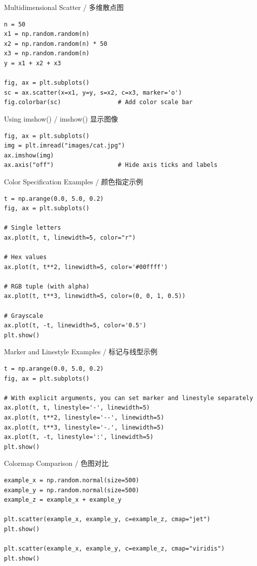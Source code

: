 \documentclass[11pt,a4paper]{report}
\begin{document}
\begin{examplebox}{Multidimensional Scatter / 多维散点图}
\begin{lstlisting}
n = 50
x1 = np.random.random(n)
x2 = np.random.random(n) * 50
x3 = np.random.random(n)
y = x1 + x2 + x3

fig, ax = plt.subplots()
sc = ax.scatter(x=x1, y=y, s=x2, c=x3, marker='o')
fig.colorbar(sc)                # Add color scale bar
\end{lstlisting}
\end{examplebox}

\begin{examplebox}{Using imshow() / imshow() 显示图像}
\begin{lstlisting}
fig, ax = plt.subplots()
img = plt.imread("images/cat.jpg")
ax.imshow(img)
ax.axis("off")                  # Hide axis ticks and labels
\end{lstlisting}
\end{examplebox}

\begin{examplebox}{Color Specification Examples / 颜色指定示例}
\begin{lstlisting}
t = np.arange(0.0, 5.0, 0.2)
fig, ax = plt.subplots()

# Single letters
ax.plot(t, t, linewidth=5, color="r")

# Hex values
ax.plot(t, t**2, linewidth=5, color='#00ffff')

# RGB tuple (with alpha)
ax.plot(t, t**3, linewidth=5, color=(0, 0, 1, 0.5))

# Grayscale
ax.plot(t, -t, linewidth=5, color='0.5')
plt.show()
\end{lstlisting}
\end{examplebox}

\begin{examplebox}{Marker and Linestyle Examples / 标记与线型示例}
\begin{lstlisting}
t = np.arange(0.0, 5.0, 0.2)
fig, ax = plt.subplots()

# With explicit arguments, you can set marker and linestyle separately
ax.plot(t, t, linestyle='-', linewidth=5)
ax.plot(t, t**2, linestyle='--', linewidth=5)
ax.plot(t, t**3, linestyle='-.', linewidth=5)
ax.plot(t, -t, linestyle=':', linewidth=5)
plt.show()
\end{lstlisting}
\end{examplebox}

\begin{examplebox}{Colormap Comparison / 色图对比}
\begin{lstlisting}
example_x = np.random.normal(size=500)
example_y = np.random.normal(size=500)
example_z = example_x + example_y

plt.scatter(example_x, example_y, c=example_z, cmap="jet")
plt.show()

plt.scatter(example_x, example_y, c=example_z, cmap="viridis")
plt.show()
\end{lstlisting}
\end{examplebox}
\end{document}
